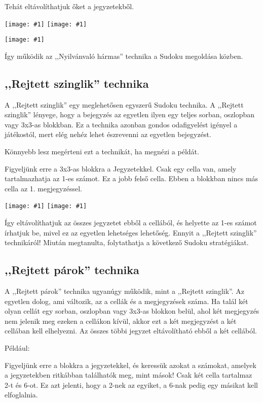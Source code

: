 \documentclass[a4paper,12pt,twoside]{article}
\newcommand{\kep}[1]{\texttt{[image: \#1]}}
\begin{document}
Tehát eltávolíthatjuk őket a jegyzetekből.

\kep{1646983350-7. Obvious triples_1.png}
\kep{1646983351-7. Obvious triples_2.png}

\kep{1646983350-7. Obvious triples_3.png}

Így működik az ,,Nyilvánvaló hármas'' technika a Sudoku megoldása közben.

\clearpage
\subsection{,,Rejtett szinglik'' technika}

A ,,Rejtett szinglik'' egy meglehetősen egyszerű Sudoku technika. A ,,Rejtett szinglik'' lényege, hogy a bejegyzés az egyetlen ilyen egy teljes sorban, oszlopban vagy 3x3-as blokkban. Ez a technika azonban gondos odafigyelést igényel a játékostól, mert elég nehéz lehet észrevenni az egyetlen bejegyzést.

Könnyebb lesz megérteni ezt a technikát, ha megnézi a példát.

Figyeljünk erre a 3x3-as blokkra a Jegyzetekkel. Csak egy cella van, amely tartalmazhatja az 1-es számot. Ez a jobb felső cella. Ebben a blokkban nincs más cella az 1. megjegyzéssel.

\kep{1646984732-8. Hidden singles_1.png}
\kep{1646984732-8. Hidden singles_2.png}

Így eltávolíthatjuk az összes jegyzetet ebből a cellából, és helyette az 1-es számot írhatjuk be, mivel ez az egyetlen lehetséges lehetőség.
Ennyit a ,,Rejtett szinglik'' technikáról! Miután megtanulta, folytathatja a következő Sudoku stratégiákat.



\subsection{,,Rejtett párok'' technika}

A ,,Rejtett párok'' technika ugyanúgy működik, mint a ,,Rejtett szinglik''. Az egyetlen dolog, ami változik, az a cellák és a megjegyzések száma. Ha talál két olyan cellát egy sorban, oszlopban vagy 3x3-as blokkon belül, ahol két megjegyzés nem jelenik meg ezeken a cellákon kívül, akkor ezt a két megjegyzést a két cellában kell elhelyezni. Az összes többi jegyzet eltávolítható ebből a két cellából.

Például:

Figyeljünk erre a blokkra a jegyzetekkel, és keressük azokat a számokat, amelyek a jegyzetekben ritkábban találhatók meg, mint mások! Csak két cella tartalmaz 2-t és 6-ot. Ez azt jelenti, hogy a 2-nek az egyiket, a 6-nak pedig egy másikat kell elfoglalnia.
\end{document}
